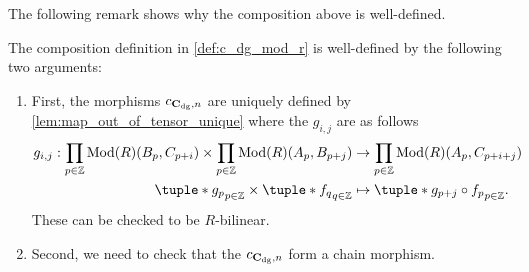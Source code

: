 The following remark shows why the composition above is well-defined.

\begin{remark}
    The composition definition in \autoref{def:c_dg_mod_r} is well-defined by the following two arguments:

    \begin{enumerate}
        \item {
            First, the morphisms \( c_{\operatorname{\mathbf{C}}_{\operatorname{dg}}, n} \) are uniquely defined by \autoref{lem:map_out_of_tensor_unique} where the \( g_{i, j} \) are as follows
            \begin{align*}
                g_{i, j}: \prod_{p \in \Zb} \Mod(R)(B_p, C_{p + i}) \times \prod_{p \in \Zb} \Mod(R)(A_p, B_{p + j}) &\to \prod_{p \in \Zb} \Mod(R)(A_p, C_{p + i + j}) \\
                \tuple*{ g_p }_{p \in \Zb} \times \tuple*{ f_q }_{q \in \Zb} &\mapsto \tuple*{ g_{p + j} \circ f_p }_{p \in \Zb}.
            \end{align*}
            These can be checked to be \( R \)-bilinear.
        }
        \item {
            Second, we need to check that the \( c_{\operatorname{\mathbf{C}}_{\operatorname{dg}}, n} \) form a chain morphism.

}
\end{enumerate}
\end{remark}
